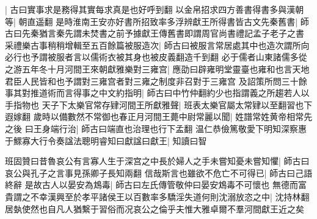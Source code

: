 |{
	古曰實事求是務得其實每求真是也好呼到翻}
以金帛招求四方善書得書多與漢朝等|{
	朝直遥翻}
是時淮南王安亦好書所招致率多浮辨獻王所得書皆古文先秦舊書|{
	師古曰先秦猶言秦先謂未焚書之前予據獻王傳舊書即謂周官尚書禮記孟子老子之書}
采禮樂古事稍稍增輯至五百餘篇被服造次|{
	師古曰被服言常居處其中也造次謂所向必行也予謂被服者言以儒術衣被其身也被皮義翻造千到翻}
必于儒者山東諸儒多從之游五年冬十月河間王來朝獻雅樂對三雍宫|{
	應劭曰辟雍明堂靈臺也雍和也言天地君臣人民皆和也予謂對三雍宫者對三雍之制度非召對于三雍宫}
及詔策所問三十餘事其對推道術而言得事之中文約指明|{
	師古曰中竹仲翻約少也指謂義之所趨若人以手指物也}
天子下太樂官常存肄河間王所獻雅聲|{
	班表太樂官屬太常肄以至翻習也下遐嫁翻}
歲時以備數然不常御也春正月河間王薨中尉常麗以聞|{
	姓譜常姓黄帝相常先之後}
曰王身端行治|{
	師古曰端直也治理也行下孟翻}
温仁恭儉篤敬愛下明知深察惠于鰥寡大行令奏諡法聰明睿知曰獻諡曰獻王|{
	知讀曰智}


班固贊曰昔魯哀公有言寡人生于深宫之中長於婦人之手未嘗知憂未嘗知懼|{
	師古曰哀公與孔子之言事見孫卿子長知兩翻}
信哉斯言也雖欲不危亡不可得已|{
	師古曰己語終辭}
是故古人以晏安為鴆毒|{
	師古曰左氏傳管敬仲曰晏安鴆毒不可懷也}
無德而富貴謂之不幸漢興至於孝平諸侯王以百數率多驕淫失道何則沈溺放恣之中|{
	沈持林翻}
居埶使然也自凡人猶繫于習俗而况哀公之倫乎夫惟大雅卓爾不羣河間獻王近之矣

